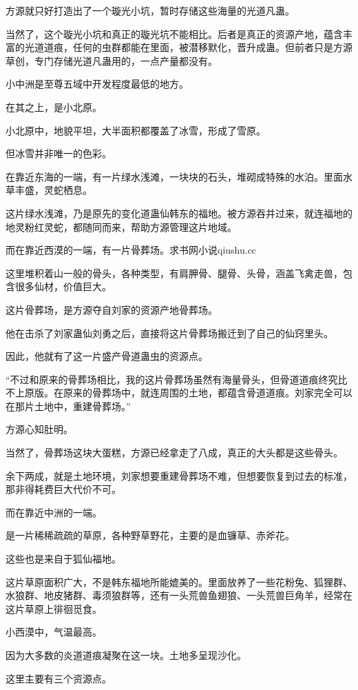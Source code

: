 \begin{this_body}
方源就只好打造出了一个璇光小坑，暂时存储这些海量的光道凡蛊。

当然了，这个璇光小坑和真正的璇光坑不能相比。后者是真正的资源产地，蕴含丰富的光道道痕，任何的虫群都能在里面，被潜移默化，晋升成蛊。但前者只是方源草创，专门存储光道凡蛊用的，一点产量都没有。

小中洲是至尊五域中开发程度最低的地方。

在其之上，是小北原。

小北原中，地貌平坦，大半面积都覆盖了冰雪，形成了雪原。

但冰雪并非唯一的色彩。

在靠近东海的一端，有一片绿水浅滩，一块块的石头，堆砌成特殊的水泊。里面水草丰盛，灵蛇栖息。

这片绿水浅滩，乃是原先的变化道蛊仙韩东的福地。被方源吞并过来，就连福地的地灵粉红灵蛇，都随同而来，帮助方源管理这片地域。

而在靠近西漠的一端，有一片骨葬场。求书网小说qiushu.cc

这里堆积着山一般的骨头，各种类型，有肩胛骨、腿骨、头骨，涵盖飞禽走兽，包含很多仙材，价值巨大。

这片骨葬场，是方源夺自刘家的资源产地骨葬场。

他在击杀了刘家蛊仙刘勇之后，直接将这片骨葬场搬迁到了自己的仙窍里头。

因此，他就有了这一片盛产骨道蛊虫的资源点。

“不过和原来的骨葬场相比，我的这片骨葬场虽然有海量骨头，但骨道道痕终究比不上原版。在原来的骨葬场中，就连周围的土地，都蕴含骨道道痕。刘家完全可以在那片土地中，重建骨葬场。”

方源心知肚明。

当然了，骨葬场这块大蛋糕，方源已经拿走了八成，真正的大头都是这些骨头。

余下两成，就是土地环境，刘家想要重建骨葬场不难，但想要恢复到过去的标准，那非得耗费巨大代价不可。

而在靠近中洲的一端。

是一片稀稀疏疏的草原，各种野草野花，主要的是血镰草、赤斧花。

这些也是来自于狐仙福地。

这片草原面积广大，不是韩东福地所能媲美的。里面放养了一些花粉兔、狐狸群、水狼群、地皮猪群、毒须狼群等，还有一头荒兽鱼翅狼、一头荒兽巨角羊，经常在这片草原上徘徊觅食。

小西漠中，气温最高。

因为大多数的炎道道痕凝聚在这一块。土地多呈现沙化。

这里主要有三个资源点。


\end{this_body}
